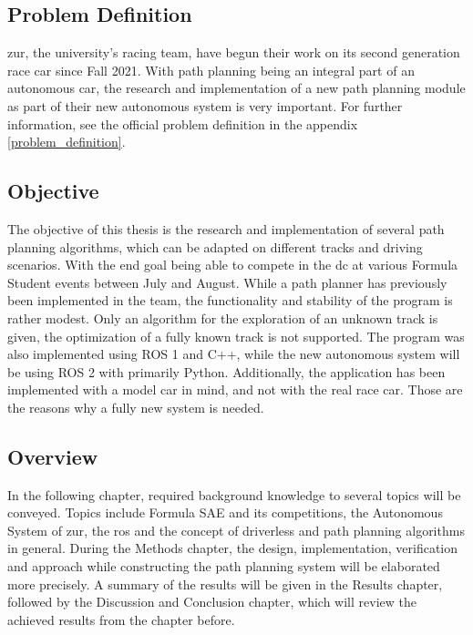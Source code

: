 \subsection{Problem Definition}
\acrlong{zur}, the university's racing team, have begun their work on its second generation race car since Fall 2021. With path planning being an integral part of an autonomous car, the research and implementation of a new path planning module as part of their new autonomous system is very important. For further information, see the official problem definition in the appendix \ref{problem_definition}.

\subsection{Objective}
The objective of this thesis is the research and implementation of several path planning algorithms, which can be adapted on different tracks and driving scenarios. With the end goal being able to compete in the \acrlong{dc} at various Formula Student events between July and August. While a path planner has previously been implemented in the team, the functionality and stability of the program is rather modest. Only an algorithm for the exploration of an unknown track is given, the optimization of a fully known track is not supported. The program was also implemented using ROS 1 and C++, while the new autonomous system will be using ROS 2 with primarily Python. Additionally, the application has been implemented with a model car in mind, and not with the real race car. Those are the reasons why a fully new system is needed.

\subsection{Overview}
In the following chapter, required background knowledge to several topics will be conveyed. Topics include Formula SAE and its competitions, the Autonomous System of \acrlong{zur}, the \acrlong{ros} and the concept of driverless and path planning algorithms in general. During the Methods chapter, the design, implementation, verification and approach while constructing the path planning system will be elaborated more precisely. A summary of the results will be given in the Results chapter, followed by the Discussion and Conclusion chapter, which will review the achieved results from the chapter before.
